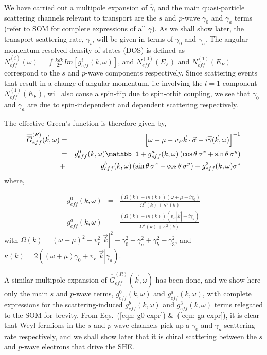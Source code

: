 \documentclass[twocolumn,epsfig,a4paper,amsmath,amssymb,showpacs,prl,superscriptaddress]{revtex4-1}
\newcommand{\ba}{\begin{eqnarray}}
\newcommand{\ea}{\end{eqnarray}}
\newcommand{\mI}{{\mathbb 1}}
\newcommand{\bl}{\left (}
\newcommand{\br}{\right )}
\newcommand{\Gbar}{\overline{\overline{G}}}
\newcommand{\gbar}{\overline{\overline{\gamma}}}
\begin{document}
We have carried out a multipole expansion of $\gbar$, and the main quasi-particle scattering channels relevant to transport are the $s$ and $p$-wave $\gamma_0$ and $\gamma_a$ terms (refer to SOM for complete expressions of all $\gamma$). As we shall show later, the transport scattering rate, $\gamma_t$, will be given in terms of $\gamma_0$ and $\gamma_a$. The angular momentum resolved density of states (DOS) is defined as $N^{(i)}_{eff}(\omega) = \int \frac{k dk}{2 \pi} Im \left[ g^{i}_{eff}(k, \omega) \right]$, and $N^{(0)}_{eff}(E_F)$ and $N^{(1)}_{eff}(E_F)$ correspond to the $s$ and $p$-wave components respectively. Since scattering events that result in a change of angular momentum, i.e involving the $l = 1$ component $N^{(1)}_{eff}(E_F)$, will also cause a spin-flip due to spin-orbit coupling, we see that $\gamma_{0}$ and $\gamma_a$ are due to spin-independent and dependent scattering respectively.

The effective Green's function is therefore given by,
%
\ba
\label{eqn: eff Greens func}
\Gbar^{(R)}_{eff}(\vec{k}, \omega) & = & \left[ \omega + \mu - v_F \vec{k} \cdot \vec{\sigma} - i \gbar(\vec{k}, \omega) \right]^{-1} \\
& = & g^0_{eff}(k ,\omega) \mI + g^a_{eff}(k, \omega) \bl \cos \theta \, \sigma^x + \sin \theta \, \sigma^y \br \cr
 & + & g^b_{eff}(k, \omega) \bl \sin \theta \, \sigma^x - \cos \theta \, \sigma^y \br + g^3_{eff}(k, \omega) \sigma^z \nonumber
\ea
%
where,

\begin{subequations}
\ba
\label{eqn: g0 expr}
 g^0_{eff}(k, \omega) & = & \frac{(\Omega(k) + i \kappa(k)) (\omega + \mu - i \gamma_0 )}{\Omega^2(k) + \kappa^2(k)} \\
 \label{eqn: ga expr}
 g^a_{eff}(k, \omega) & = & \frac{(\Omega(k) + i \kappa(k)) (v_F |\vec{k}| + i \gamma_a )}{\Omega^2(k) + \kappa^2(k)}
\ea
\end{subequations}
%
with $\Omega(k) = (\omega + \mu)^2 - v_F^2 |\vec{k}|^2 - \gamma_0^2 + \gamma_a^2 + \gamma_b^2 - \gamma_3^2$, and $\kappa(k) = 2 \bl (\omega + \mu) \gamma_0 + v_F |\vec{k}| \gamma_a \br$.

A similar multipole expansion of $\Gbar^{(R)}_{eff}(\vec{k}, \omega)$ has been done, and we show here only the main $s$ and $p$-wave terms, $g^0_{eff}(k, \omega)$ and $ g^a_{eff}(k, \omega)$, with complete expressions for the scattering-induced $g^b_{eff}(k, \omega)$ and $g^3_{eff}(k, \omega)$ terms relegated to the SOM for brevity. From Eqs.~(\ref{eqn: g0 expr}) \&~(\ref{eqn: ga expr}), it is clear that Weyl fermions in the $s$ and $p$-wave channels pick up a $\gamma_0$ and $\gamma_a$ scattering rate respectively, and we shall show later that it is chiral scattering between the $s$ and $p$-wave electrons that drive the SHE.
\end{document}
